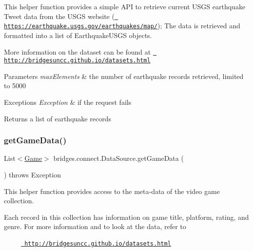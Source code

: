 This helper function provides a simple A\+PI to retrieve current U\+S\+GS earthquake Tweet data from the U\+S\+GS website (\href{https://earthquake.usgs.gov/earthquakes/map/}{\texttt{ https\+://earthquake.\+usgs.\+gov/earthquakes/map/}}); The data is retrieved and formatted into a list of Earthquake\+U\+S\+GS objects.

More information on the dataset can be found at \href{http://bridgesuncc.github.io/datasets.html}{\texttt{ http\+://bridgesuncc.\+github.\+io/datasets.\+html}}


\begin{DoxyParams}{Parameters}
{\em max\+Elements} & the number of earthquake records retrieved, limited to 5000 \\
\hline
\end{DoxyParams}

\begin{DoxyExceptions}{Exceptions}
{\em Exception} & if the request fails\\
\hline
\end{DoxyExceptions}
\begin{DoxyReturn}{Returns}
a list of earthquake records 
\end{DoxyReturn}
\mbox{\label{classbridges_1_1connect_1_1_data_source_ab3744c6b103281724bdd832da0924312}} 
\subsubsection{\texorpdfstring{getGameData()}{getGameData()}}
{\footnotesize\ttfamily List$<$\mbox{\hyperlink{classbridges_1_1data__src__dependent_1_1_game}{Game}}$>$ bridges.\+connect.\+Data\+Source.\+get\+Game\+Data (\begin{DoxyParamCaption}{ }\end{DoxyParamCaption}) throws Exception}

This helper function provides access to the meta-\/data of the video game collection.

Each record in this collection has information on game title, platform, rating, and genre. For more information and to look at the data, refer to 

~~~~~\href{http://bridgesuncc.github.io/datasets.html}{\texttt{ http\+://bridgesuncc.\+github.\+io/datasets.\+html}} 


